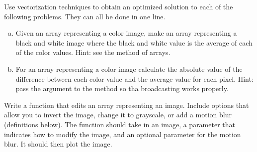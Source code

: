 \begin{problem}
Use vectorization techniques to obtain an optimized solution to each of the following problems.
They can all be done in one line.
\begin{enumerate}[a)]

\item Given an array representing a color image, make an array representing a black and white image where the black and white value is the average of each of the color values.
Hint: see the  method of arrays.

\item For an array representing a color image calculate the absolute value of the difference between each color value and the average value for each pixel.
Hint: pass the  argument to the  method so tha broadcasting works properly.

\end{enumerate}
\end{problem}

\begin{problem}
Write a function that edits an array representing an image.
Include options that allow you to  invert the image, change it to grayscale, or add a motion blur (definitions below).
The function should take in an image, a parameter that indicates how to modify the image, and an optional parameter for the motion blur.
It should then plot the image.
\end{problem}

